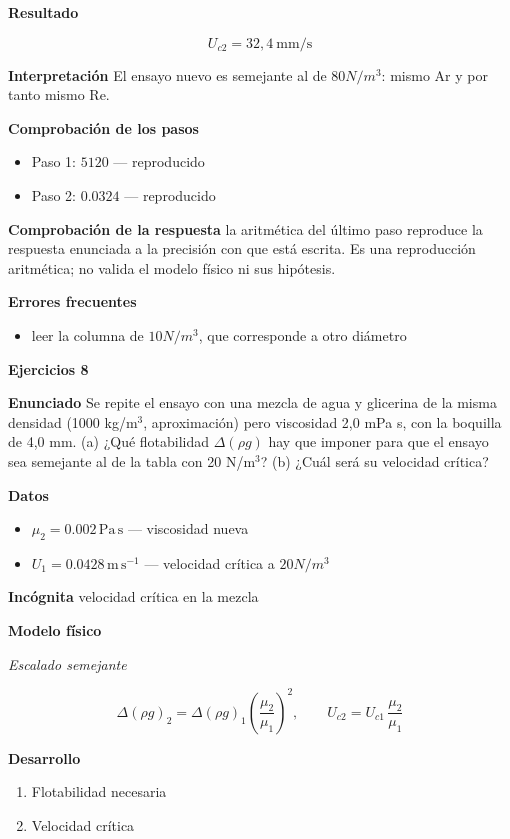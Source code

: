 \documentclass[10pt,openany]{book}
\begin{document}
\noindent\textbf{Resultado}

\[
U_{c2} = 32{,}4\ \mathrm{mm/s}
\]

\noindent\textbf{Interpretación}
El ensayo nuevo es semejante al de \(80 N/m^3\): mismo Ar y por tanto mismo Re.

\noindent\textbf{Comprobación de los pasos}
\begin{itemize}
\item Paso 1: $5120$ — reproducido
\item Paso 2: $0.0324$ — reproducido
\end{itemize}

\noindent\textbf{Comprobación de la respuesta} la aritmética del último paso reproduce la respuesta enunciada a la precisión con que está escrita. Es una reproducción aritmética; no valida el modelo físico ni sus hipótesis.

\noindent\textbf{Errores frecuentes}
\begin{itemize}
\item leer la columna de \(10 N/m^3\), que corresponde a otro diámetro
\end{itemize}

\noindent\textbf{Ejercicios 8}

\noindent\textbf{Enunciado}
Se repite el ensayo con una mezcla de agua y glicerina de la misma densidad (1000 kg/m\(^3\), aproximación) pero viscosidad 2,0 mPa s, con la boquilla de 4,0 mm. (a) ¿Qué flotabilidad \(\Delta(\rho g)\) hay que imponer para que el ensayo sea semejante al de la tabla con 20 N/m\(^3\)? (b) ¿Cuál será su velocidad crítica?

\noindent\textbf{Datos}
\begin{itemize}
\item $\mu_{2} = 0.002\,\mathrm{Pa}\,\mathrm{s}$ — viscosidad nueva
\item $U_{1} = 0.0428\,\mathrm{m}\,\mathrm{s}^{-1}$ — velocidad crítica a \(20 N/m^3\)
\end{itemize}

\noindent\textbf{Incógnita}
velocidad crítica en la mezcla

\noindent\textbf{Modelo físico}

\noindent\textit{Escalado semejante}

\[
\Delta(\rho g)_2 = \Delta(\rho g)_1\left(\frac{\mu_2}{\mu_1}\right)^{2},\qquad U_{c2} = U_{c1}\,\frac{\mu_2}{\mu_1}
\]

\noindent\textbf{Desarrollo}
\begin{enumerate}
\item
Flotabilidad necesaria
\item
Velocidad crítica
\end{enumerate}
\end{document}
